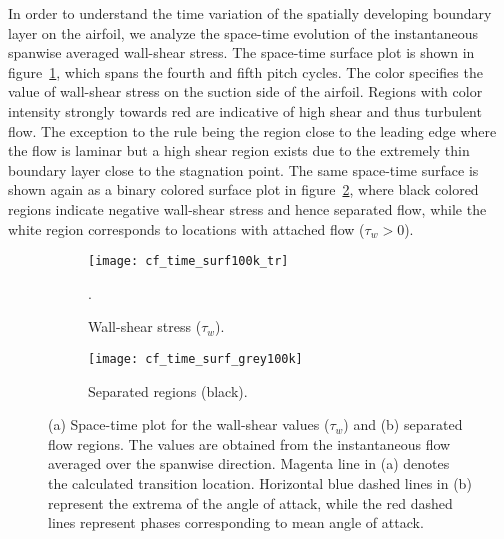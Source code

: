 In order to understand the time variation of the spatially developing boundary layer on the airfoil, we analyze the space-time evolution of the instantaneous spanwise averaged wall-shear stress. The space-time surface plot is shown in figure~\ref{fig:cf-time}, which spans the fourth and fifth pitch cycles. The color specifies the value of wall-shear stress on the suction side of the airfoil. Regions with color intensity strongly towards red are indicative of high shear and thus turbulent flow. The exception to the rule being the region close to the leading edge where the flow is laminar but a high shear region exists due to the extremely thin boundary layer close to the stagnation point. The same space-time surface is shown again as a binary colored surface plot in figure~\ref{fig:separation-time}, where black colored regions indicate negative wall-shear stress and hence separated flow, while the white region corresponds to locations with attached flow ($\tau_{w}>0$).
\begin{figure}[h]
	\centering
	\begin{subfigure}[t]{0.45\textwidth}
		\centering
		\texttt{[image: cf\_time\_surf100k\_tr]}
		\caption{Wall-shear stress ($\tau_{w}$).}. 
		\label{fig:cf-time}
	\end{subfigure}
	\begin{subfigure}[t]{0.45\textwidth}
		\centering
		\texttt{[image: cf\_time\_surf\_grey100k]}
		\caption{Separated regions (black).} 
		\label{fig:separation-time}
	\end{subfigure}
	\caption{(a) Space-time plot for the wall-shear values ($\tau_{w}$) and (b) separated flow regions. The values are obtained from the instantaneous flow averaged over the spanwise direction. Magenta line in (a) denotes the calculated transition location. Horizontal blue dashed lines in (b) represent the extrema of the angle of attack, while the red dashed lines represent phases corresponding to mean angle of attack.}
	\label{fig:space-time}
\end{figure}

